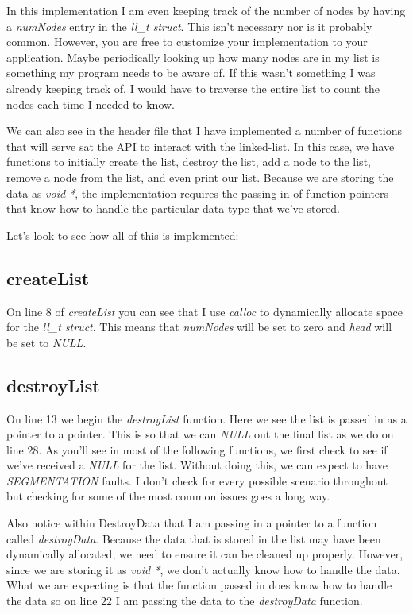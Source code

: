 \documentclass[../main.tex]{subfiles}
\begin{document}
	In this implementation I am even keeping track of the number of nodes by having a \textit{numNodes} entry in the \textit{ll\_t struct}.  This isn't necessary nor is it probably common.  However, you are free to customize your implementation to your application.  Maybe periodically looking up how many nodes are in my list is something my program needs to be aware of.  If this wasn't something I was already keeping track of, I would have to traverse the entire list to count the nodes each time I needed to know.  
	
	We can also see in the header file that I have implemented a number of functions that will serve sat the API to interact with the linked-list.  In this case, we have functions to initially create the list, destroy the list, add a node to the list, remove a node from the list, and even print our list.  Because we are storing the data as \textit{void *}, the implementation requires the passing in of function pointers that know how to handle the particular data type that we've stored.  
	
	Let's look to see how all of this is implemented:\\

	
	
	\subsection{createList}
	On line 8 of \textit{createList} you can see that I use \textit{calloc} to dynamically allocate space for the \textit{ll\_t struct}.  This means that \textit{numNodes} will be set to zero and \textit{head} will be set to \textit{NULL}.
	
	\subsection{destroyList}
	On line 13 we begin the \textit{destroyList} function.  Here we see the list is passed in as a pointer to a pointer.  This is so that we can \textit{NULL} out the final list as we do on line 28.  As you'll see in most of the following functions, we first check to see if we've received a \textit{NULL} for the list.  Without doing this, we can expect to have \textit{SEGMENTATION} faults.  I don't check for every possible scenario throughout but checking for some of the most common issues goes a long way.
	
	Also notice within DestroyData that I am passing in a pointer to a function called \textit{destroyData}.  Because the data that is stored in the list may have been dynamically allocated, we need to ensure it can be cleaned up properly. However, since we are storing it as \textit{void *}, we don't actually know how to handle the data.  What we are expecting is that the function passed in does know how to handle the data so on line 22 I am passing the data to the \textit{destroyData} function.
	
\end{document}

